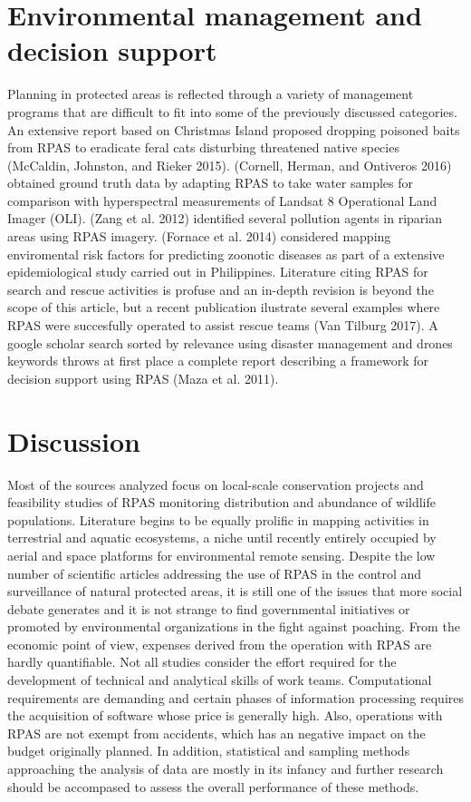 \documentclass[]{interact}
\theoremstyle{plain}%
\theoremstyle{definition}
\theoremstyle{remark}
\begin{document}
\section{Environmental management and decision
support}\label{environmental-management-and-decision-support}

Planning in protected areas is reflected through a variety of management
programs that are difficult to fit into some of the previously discussed
categories. An extensive report based on Christmas Island proposed
dropping poisoned baits from RPAS to eradicate feral cats disturbing
threatened native species (McCaldin, Johnston, and Rieker 2015).
(Cornell, Herman, and Ontiveros 2016) obtained ground truth data by
adapting RPAS to take water samples for comparison with hyperspectral
measurements of Landsat 8 Operational Land Imager (OLI). (Zang et al.
2012) identified several pollution agents in riparian areas using RPAS
imagery. (Fornace et al. 2014) considered mapping enviromental risk
factors for predicting zoonotic diseases as part of a extensive
epidemiological study carried out in Philippines. Literature citing RPAS
for search and rescue activities is profuse and an in-depth revision is
beyond the scope of this article, but a recent publication ilustrate
several examples where RPAS were succesfully operated to assist rescue
teams (Van Tilburg 2017). A google scholar search sorted by relevance
using disaster management and drones keywords throws at first place a
complete report describing a framework for decision support using RPAS
(Maza et al. 2011).

\section{Discussion}\label{discussion}

Most of the sources analyzed focus on local-scale conservation projects
and feasibility studies of RPAS monitoring distribution and abundance of
wildlife populations. Literature begins to be equally prolific in
mapping activities in terrestrial and aquatic ecosystems, a niche until
recently entirely occupied by aerial and space platforms for
environmental remote sensing. Despite the low number of scientific
articles addressing the use of RPAS in the control and surveillance of
natural protected areas, it is still one of the issues that more social
debate generates and it is not strange to find governmental initiatives
or promoted by environmental organizations in the fight against
poaching. From the economic point of view, expenses derived from the
operation with RPAS are hardly quantifiable. Not all studies consider
the effort required for the development of technical and analytical
skills of work teams. Computational requirements are demanding and
certain phases of information processing requires the acquisition of
software whose price is generally high. Also, operations with RPAS are
not exempt from accidents, which has an negative impact on the budget
originally planned. In addition, statistical and sampling methods
approaching the analysis of data are mostly in its infancy and further
research should be accompased to assess the overall performance of these
methods.
\end{document}
